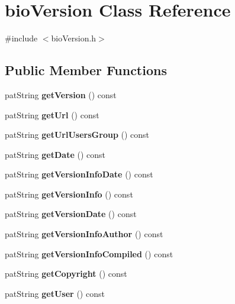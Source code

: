 \hypertarget{classbio_version}{}\section{bio\+Version Class Reference}
\label{classbio_version}


{\ttfamily \#include $<$bio\+Version.\+h$>$}

\subsection*{Public Member Functions}
\begin{DoxyCompactItemize}
\item 
\mbox{\label{classbio_version_ae543118fe94b406699b3254a508e4ac3}} 
pat\+String {\bfseries get\+Version} () const
\item 
\mbox{\label{classbio_version_a0c948190bcf93343421cd05bab5ba81e}} 
pat\+String {\bfseries get\+Url} () const
\item 
\mbox{\label{classbio_version_a8facd48dddd437e14fa809d659a0c960}} 
pat\+String {\bfseries get\+Url\+Users\+Group} () const
\item 
\mbox{\label{classbio_version_af9198be7b58c991dd320e3140b5e400a}} 
pat\+String {\bfseries get\+Date} () const
\item 
\mbox{\label{classbio_version_aafa192219d0e37fdcdb3fb388961675d}} 
pat\+String {\bfseries get\+Version\+Info\+Date} () const
\item 
\mbox{\label{classbio_version_ae08d47dd32fdf37d3f2bd99d2129d402}} 
pat\+String {\bfseries get\+Version\+Info} () const
\item 
\mbox{\label{classbio_version_ab2b11f77775600cf5ebe010a31fa34b2}} 
pat\+String {\bfseries get\+Version\+Date} () const
\item 
\mbox{\label{classbio_version_a593d0e3a2b0467fefeec1bd17894fba5}} 
pat\+String {\bfseries get\+Version\+Info\+Author} () const
\item 
\mbox{\label{classbio_version_ad144aeb85933846a8466192adaa025dc}} 
pat\+String {\bfseries get\+Version\+Info\+Compiled} () const
\item 
\mbox{\label{classbio_version_ada45a635c9362ee2b824d8de71325033}} 
pat\+String {\bfseries get\+Copyright} () const
\item 
\mbox{\label{classbio_version_a37dbfe6a69f58d76acd094001a21fe6d}} 
pat\+String {\bfseries get\+User} () const
\end{DoxyCompactItemize}
